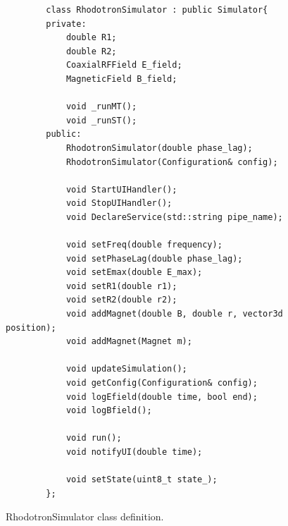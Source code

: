 \documentclass[a4paper,oneside,12pt]{report}
\numberwithin{equation}{chapter}
\begin{document}
\begin{figure}[H]
    \centering
    \begin{verbatim}
        class RhodotronSimulator : public Simulator{
        private:
            double R1;
            double R2;
            CoaxialRFField E_field;
            MagneticField B_field;

            void _runMT();
            void _runST();
        public:
            RhodotronSimulator(double phase_lag);
            RhodotronSimulator(Configuration& config);

            void StartUIHandler();
            void StopUIHandler();
            void DeclareService(std::string pipe_name);

            void setFreq(double frequency);
            void setPhaseLag(double phase_lag);
            void setEmax(double E_max);
            void setR1(double r1);
            void setR2(double r2);
            void addMagnet(double B, double r, vector3d position);
            void addMagnet(Magnet m);
            
            void updateSimulation();
            void getConfig(Configuration& config);
            void logEfield(double time, bool end);
            void logBfield();

            void run();
            void notifyUI(double time);

            void setState(uint8_t state_);
        };
    \end{verbatim}
    \vspace{20pt}
    \caption{RhodotronSimulator class definition.}
    \label{fig:rhodosim_class}
\end{figure}
\end{document}
